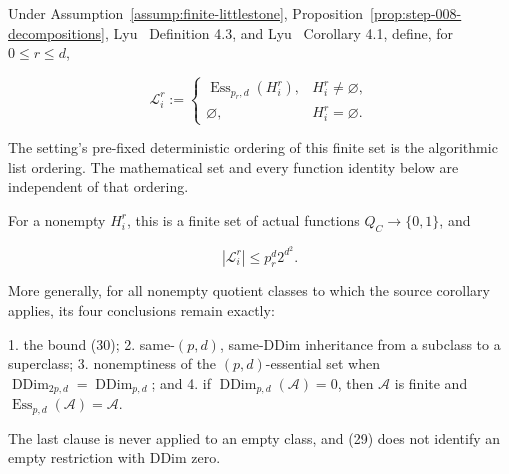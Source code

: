 \begin{proposition}\label{prop:step-008-essential-lists}
Under Assumption~\ref{assump:finite-littlestone},
Proposition~\ref{prop:step-008-decompositions}, Lyu~\citep{lyu2025} Definition 4.3, and
Lyu~\citep{lyu2025} Corollary 4.1, define, for \(0\le r\le d\),

\[
\mathcal L_i^r:=
 \begin{cases}
 \operatorname{Ess}_{p_r,d}(H_i^r),&H_i^r\ne\varnothing,\\
 \varnothing,&H_i^r=\varnothing.
 \end{cases}
\tag{29}
\]

The setting's pre-fixed deterministic ordering of this finite set is the
algorithmic list ordering. The mathematical set and every function identity
below are independent of that ordering.

For a nonempty \(H_i^r\), this is a finite set of actual functions
\(Q_C\to\{0,1\}\), and

\[
 |\mathcal L_i^r|\le p_r^d2^{d^2}.
\tag{30}
\]

More generally, for all nonempty quotient classes to which the source
corollary applies, its four conclusions remain exactly:

1. the bound (30);
2. same-\((p,d)\), same-DDim inheritance from a subclass to a superclass;
3. nonemptiness of the \((p,d)\)-essential set when
   \(\operatorname{DDim}_{2p,d}=\operatorname{DDim}_{p,d}\); and
4. if \(\operatorname{DDim}_{p,d}(\mathcal A)=0\), then
   \(\mathcal A\) is finite and
   \(\operatorname{Ess}_{p,d}(\mathcal A)=\mathcal A\).

The last clause is never applied to an empty class, and (29) does not
identify an empty restriction with DDim zero.


\end{proposition}

